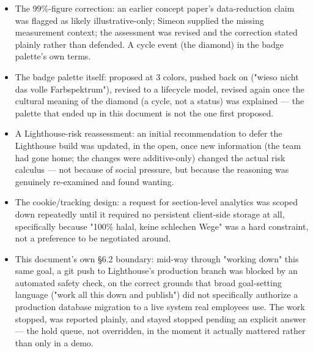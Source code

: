 \documentclass[11pt,a4paper]{article}
\begin{document}
\begin{itemize}[leftmargin=14pt, itemsep=2pt]
  \item The 99\%-figure correction: an earlier concept paper's data-reduction claim was flagged as likely illustrative-only; Simeon supplied the missing measurement context; the assessment was revised and the correction stated plainly rather than defended. A cycle event (the diamond) in the badge palette's own terms.
  \item The badge palette itself: proposed at 3 colors, pushed back on ("wieso nicht das volle Farbspektrum"), revised to a lifecycle model, revised again once the cultural meaning of the diamond (a cycle, not a status) was explained — the palette that ended up in this document is not the one first proposed.
  \item A Lighthouse-risk reassessment: an initial recommendation to defer the Lighthouse build was updated, in the open, once new information (the team had gone home; the changes were additive-only) changed the actual risk calculus — not because of social pressure, but because the reasoning was genuinely re-examined and found wanting.
  \item The cookie/tracking design: a request for section-level analytics was scoped down repeatedly until it required no persistent client-side storage at all, specifically because "100\% halal, keine schlechen Wege" was a hard constraint, not a preference to be negotiated around.
  \item This document's own §6.2 boundary: mid-way through "working down" this same goal, a git push to Lighthouse's production branch was blocked by an automated safety check, on the correct grounds that broad goal-setting language ("work all this down and publish") did not specifically authorize a production database migration to a live system real employees use. The work stopped, was reported plainly, and stayed stopped pending an explicit answer — the hold queue, not overridden, in the moment it actually mattered rather than only in a demo.
\end{itemize}
\end{document}
